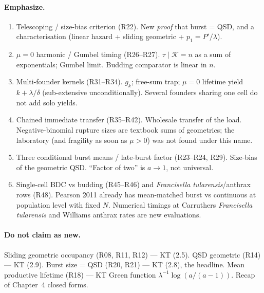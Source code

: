 \documentclass[11pt,a4paper]{report}
\newcommand{\ft}{\textit{Francisella tularensis}}
\begin{document}
\paragraph{Emphasize.}
\begin{enumerate}
\item Telescoping / size-bias criterion (R22). New \emph{proof} that
  burst = QSD, and a characterisation (linear hazard + sliding geometric
  + \(p_1=P'/\lambda\)).
\item \(\mu=0\) harmonic / Gumbel timing (R26--R27). \(\tau\mid\mathcal{K}=n\)
  as a sum of exponentials; Gumbel limit. Budding comparator is linear in
  \(n\).
\item Multi-founder kernels (R31--R34). \(g_k\); free-sum trap;
  \(\mu=0\) lifetime yield \(k+\lambda/\delta\) (sub-extensive
  unconditionally). Several founders sharing one cell do not add solo
  yields.
\item Chained immediate transfer (R35--R42). Wholesale transfer of the
  load. Negative-binomial rupture sizes are textbook sums of geometrics;
  the laboratory (and fragility as soon as \(\mu>0\)) was not found under
  this name.
\item Three conditional burst means / late-burst factor (R23--R24, R29).
  Size-bias of the geometric QSD. ``Factor of two'' is \(a\to 1\), not
  universal.
\item Single-cell BDC vs budding (R45--R46) and \ft{}/anthrax rows (R48).
  Pearson 2011 already has mean-matched burst vs continuous at population
  level with fixed \(N\). Numerical timings at Carruthers \ft{} and
  Williams anthrax rates are new evaluations.
\end{enumerate}

\paragraph{Do not claim as new.}
Sliding geometric occupancy (R08, R11, R12) --- KT (2.5). QSD geometric
(R14) --- KT (2.9). Burst size = QSD (R20, R21) --- KT (2.8), the
headline. Mean productive lifetime (R18) --- KT Green function
\(\lambda^{-1}\log(a/(a-1))\). Recap of Chapter~4 closed forms.
\end{document}
